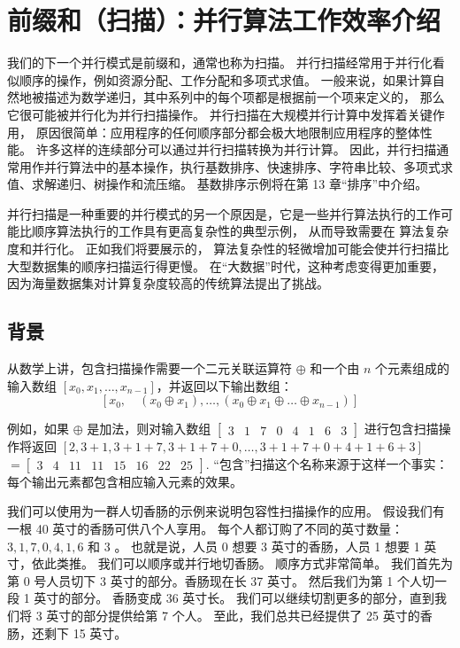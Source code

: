 \section{前缀和（扫描）：并行算法工作效率介绍}
我们的下一个并行模式是前缀和，通常也称为扫描。 并行扫描经常用于并行化看似顺序的操作，例如资源分配、工作分配和多项式求值。 
一般来说，如果计算自然地被描述为数学递归，其中系列中的每个项都是根据前一个项来定义的，
那么它很可能被并行化为并行扫描操作。 并行扫描在大规模并行计算中发挥着关键作用，
原因很简单：应用程序的任何顺序部分都会极大地限制应用程序的整体性能。 许多这样的连续部分可以通过并行扫描转换为并行计算。 
因此，并行扫描通常用作并行算法中的基本操作，执行基数排序、快速排序、字符串比较、多项式求值、求解递归、树操作和流压缩。 
基数排序示例将在第 13 章“排序”中介绍。

并行扫描是一种重要的并行模式的另一个原因是，它是一些并行算法执行的工作可能比顺序算法执行的工作具有更高复杂性的典型示例，
从而导致需要在 算法复杂度和并行化。 正如我们将要展示的，
算法复杂性的轻微增加可能会使并行扫描比大型数据集的顺序扫描运行得更慢。 
在“大数据”时代，这种考虑变得更加重要，因为海量数据集对计算复杂度较高的传统算法提出了挑战。

\subsection{背景}
从数学上讲，包含扫描操作需要一个二元关联运算符 $\oplus$ 
和一个由 $n$ 个元素组成的输入数组 $\left[x_{0}, x_{1}, \ldots, x_{n-1}\right] $，并返回以下输出数组：
$$
\left[x_{0}, \quad\left(x_{0} \oplus x_{1}\right), \ldots,\left(x_{0} \oplus x_{1} \oplus \ldots \oplus x_ {n-1}\right)\right]
$$

例如，如果 $\oplus$ 是加法，则对输入数组 $\left[\begin{array}{llllllll}
3 & 1 & 7 & 0 & 4 & 1 & 6 & 3
\end{array}\right]$ 进行包含扫描操作将返回 $[2,3+1,3+1+7,3+1+7+0, \ldots, 3+1+7+0+4+1+6+3]$ $ =\left[\begin{array}{llllllll}
3 & 4 & 11 & 11 & 15 & 16 & 22 & 25
\end{array}\right]$. “包含”扫描这个名称来源于这样一个事实：每个输出元素都包含相应输入元素的效果。

我们可以使用为一群人切香肠的示例来说明包容性扫描操作的应用。 假设我们有一根 40 英寸的香肠可供八个人享用。 
每个人都订购了不同的英寸数量： $3,1,7,0,4,1,6$ 和 3 。 
也就是说，人员 0 想要 3 英寸的香肠，人员 1 想要 1 英寸，依此类推。 我们可以顺序或并行地切香肠。 顺序方式非常简单。 
我们首先为第 0 号人员切下 3 英寸的部分。香肠现在长 37 英寸。 然后我们为第 1 个人切一段 1 英寸的部分。
香肠变成 36 英寸长。 我们可以继续切割更多的部分，直到我们将 3 英寸的部分提供给第 7 个人。 
至此，我们总共已经提供了 25 英寸的香肠，还剩下 15 英寸。

